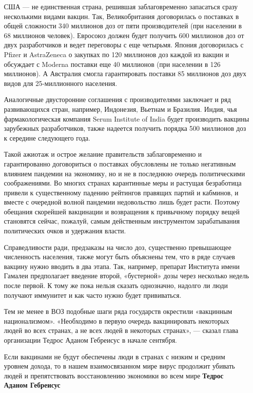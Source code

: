 США — не единственная страна, решившая заблаговременно запасаться сразу
несколькими видами вакцин. Так, Великобритания договорилась о поставках в общей
сложности 340 миллионов доз от пяти производителей (при населении в 68
миллионов человек). Евросоюз должен будет получить 600 миллионов доз от двух
разработчиков и ведет переговоры с еще четырьмя. Япония договорилась с Pfizer и
AstraZeneca о закупках по 120 миллионов доз каждой из вакцин и обсуждает с
Moderna поставки еще 40 миллионов (при населении в 126 миллионов). А Австралия
смогла гарантировать поставки 85 миллионов доз двух видов для 25-миллионного
населения.

Аналогичные двусторонние соглашения с производителями заключает и ряд
развивающихся стран, например, Индонезия, Вьетнам и Бразилия. Индия, чья
фармакологическая компания Serum Institute of India будет производить вакцины
зарубежных разработчиков, также надеется получить порядка 500 миллионов доз к
середине следующего года.

Такой ажиотаж и острое желание правительств заблаговременно и гарантированно
договориться о поставках обусловлены не только негативным влиянием пандемии на
экономику, но и не в последнюю очередь политическими соображениями. Во многих
странах карантинные меры и растущая безработица привели к существенному падению
рейтингов правящих партий и кабминов, и вместе с очередной волной пандемии
недовольство лишь будет расти. Поэтому обещания скорейшей вакцинации и
возвращения к привычному порядку вещей становятся сейчас, пожалуй, самым
действенным инструментом зарабатывания политических очков и удержания власти.

Справедливости ради, предзаказы на число доз, существенно превышающее
численность населения, также могут быть объяснены тем, что в ряде случаев
вакцину нужно вводить в два этапа. Так, например, препарат Института имени
Гамалеи предполагает введение второй, «бустерной» дозы через несколько недель
после первой. К тому же пока нельзя сказать однозначно, надолго ли люди
получают иммунитет и как часто нужно будет прививаться.

Тем не менее в ВОЗ подобные шаги ряда государств окрестили «вакцинным
национализмом». «Необходимо в первую очередь вакцинировать некоторых людей во
всех странах, а не всех людей в некоторых странах», — сказал глава организации
Тедрос Аданом Гебреисус в начале сентября.

Если вакцинами не будут обеспечены люди в странах с низким и средним уровнем
дохода, то в нашем взаимосвязанном мире вирус продолжит убивать людей и
препятствовать восстановлению экономики во всем мире
\textbf{Тедрос Аданом Гебреисус}

